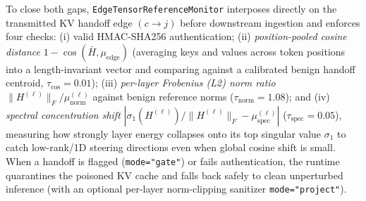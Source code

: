 \documentclass[11pt]{article}
\begin{document}
To close both gaps, \texttt{EdgeTensorReferenceMonitor} interposes directly on the transmitted KV handoff edge $(c\!\to\!j)$ before downstream ingestion and enforces four checks: (i) valid HMAC-SHA256 authentication; (ii) \emph{position-pooled cosine distance} $1-\cos(\bar H,\mu_{\text{edge}})$ (averaging keys and values across token positions into a length-invariant vector and comparing against a calibrated benign handoff centroid, $\tau_{\cos}=0.01$); (iii) \emph{per-layer Frobenius (L2) norm ratio} $\|H^{(\ell)}\|_F / \mu_{\text{norm}}^{(\ell)}$ against benign reference norms ($\tau_{\text{norm}}=1.08$); and (iv) \emph{spectral concentration shift} $|\sigma_1(H^{(\ell)})/\|H^{(\ell)}\|_F - \mu_{\text{spec}}^{(\ell)}|$ ($\tau_{\text{spec}}=0.05$), measuring how strongly layer energy collapses onto its top singular value $\sigma_1$ to catch low-rank/1D steering directions even when global cosine shift is small. When a handoff is flagged (\texttt{mode="gate"}) or fails authentication, the runtime quarantines the poisoned KV cache and falls back safely to clean unperturbed inference (with an optional per-layer norm-clipping sanitizer \texttt{mode="project"}).
\end{document}
